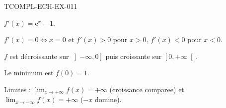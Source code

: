 \begin{corrige}{TCOMPL-ECH-EX-011}

$f'(x) = \mathrm{e}^x - 1$.


$f'(x) = 0 \iff x = 0$ et $f'(x) > 0$ pour $x > 0$, $f'(x) < 0$ pour $x < 0$.

$f$ est décroissante sur $\left]-\infty, 0\right]$ puis croissante sur $\left[0, +\infty\right[$.

Le minimum est $f(0) = 1$.

Limites : $\lim_{x \to +\infty} f(x) = +\infty$ (croissance comparee) et $\lim_{x \to -\infty} f(x) = +\infty$ ($-x$ domine).

\end{corrige}
